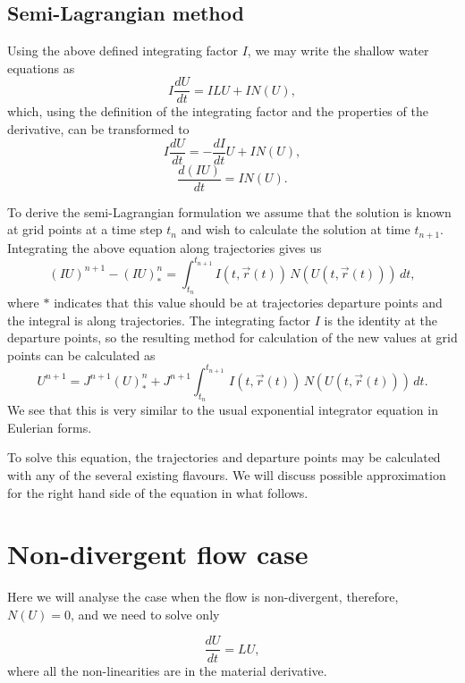 \documentclass[10pt,a4paper]{article}
\begin{document}
\subsection{Semi-Lagrangian method}
Using the above defined integrating factor $I$, we may write the shallow water equations as
\begin{equation}
I\frac{dU}{dt}=ILU+IN(U), 
\end{equation}
which, using the definition of the integrating factor and the properties of the derivative, can be transformed to 
\begin{equation}
I\frac{dU}{dt}=-\frac{dI}{dt}U+IN(U), 
\end{equation}
\begin{equation}
\frac{d(IU)}{dt}=I N(U).
\end{equation}

To derive the semi-Lagrangian formulation we assume that the solution is known at grid points at a time step $t_n$ and wish to calculate the solution at time $t_{n+1}$. Integrating the above equation along trajectories gives us 
\begin{equation}
(IU)^{n+1}-(IU)^{n}_{*}=\int_{t_n}^{t_{n+1}} I(t, \vec{r}(t))\, N(U(t, \vec{r}(t)))\, dt,
\end{equation}
where $*$ indicates that this value should be at trajectories departure points and the integral is along trajectories. The integrating factor $I$ is the identity at the departure points, so the resulting method for calculation of the new values at grid points can be calculated as
\begin{equation}
U^{n+1}=J^{n+1}(  U)^{n}_{*}+J^{n+1}\int_{t_n}^{t_{n+1}} \, I(t, \vec{r}(t))\, N(U(t, \vec{r}(t)))\,dt .
\end{equation}
We see that this is very similar to the usual exponential integrator equation in Eulerian forms.

To solve this equation, the trajectories and departure points may be calculated with any of the several existing flavours. We will discuss possible approximation for the right hand side of the equation in what follows.

\section{Non-divergent flow case}

Here we will analyse the case when the flow is non-divergent, therefore, $N(U)=0$, and we need to solve only

\begin{equation}
\frac{dU}{dt}=L U,
\label{eq:swe}
\end{equation}
where all the non-linearities are in the material derivative.
\end{document}
